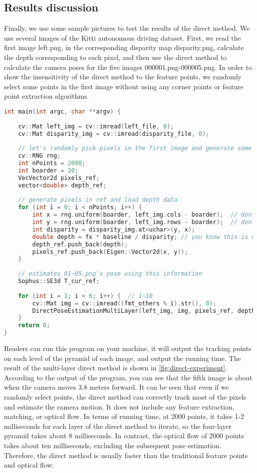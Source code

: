 \subsection{Results discussion}
Finally, we use some sample pictures to test the results of the direct method. We use several images of the Kitti\textsubscript{\cite{Geiger2013}} autonomous driving dataset. First, we read the first image left.png, in the corresponding disparity map disparity.png, calculate the depth corresponding to each pixel, and then use the direct method to calculate the camera poses for the five images 000001.png-000005.png. In order to show the insensitivity of the direct method to the feature points, we randomly select some points in the first image without using any corner points or feature point extraction algorithms.
\begin{lstlisting}[language=c++,caption=slambook2/ch8/direct_method.cpp (snippet)]
int main(int argc, char **argv) {
	
	cv::Mat left_img = cv::imread(left_file, 0);
	cv::Mat disparity_img = cv::imread(disparity_file, 0);
	
	// let's randomly pick pixels in the first image and generate some 3d points in the first image's frame
	cv::RNG rng;
	int nPoints = 2000;
	int boarder = 20;
	VecVector2d pixels_ref;
	vector<double> depth_ref;
	
	// generate pixels in ref and load depth data
	for (int i = 0; i < nPoints; i++) {
		int x = rng.uniform(boarder, left_img.cols - boarder);  // don't pick pixels close to boarder
		int y = rng.uniform(boarder, left_img.rows - boarder);  // don't pick pixels close to boarder
		int disparity = disparity_img.at<uchar>(y, x);
		double depth = fx * baseline / disparity; // you know this is disparity to depth
		depth_ref.push_back(depth);
		pixels_ref.push_back(Eigen::Vector2d(x, y));
	}
	
	// estimates 01~05.png's pose using this information
	Sophus::SE3d T_cur_ref;
	
	for (int i = 1; i < 6; i++) {  // 1~10
		cv::Mat img = cv::imread((fmt_others % i).str(), 0);
		DirectPoseEstimationMultiLayer(left_img, img, pixels_ref, depth_ref, T_cur_ref);
	}
	return 0;
}
\end{lstlisting}

Readers can run this program on your machine, it will output the tracking points on each level of the pyramid of each image, and output the running time. The result of the multi-layer direct method is shown in \autoref{fig:direct-experiment}. According to the output of the program, you can see that the fifth image is about when the camera moves 3.8 meters forward. It can be seen that even if we randomly select points, the direct method can correctly track most of the pixels and estimate the camera motion. It does not include any feature extraction, matching, or optical flow. In terms of running time, at 2000 points, it takes 1-2 milliseconds for each layer of the direct method to iterate, so the four-layer pyramid takes about 8 milliseconds. In contrast, the optical flow of 2000 points takes about ten milliseconds, excluding the subsequent pose estimation. Therefore, the direct method is usually faster than the traditional feature points and optical flow.

